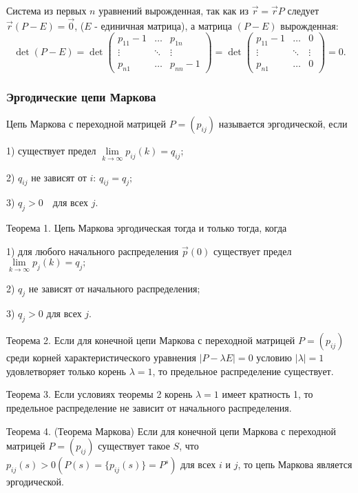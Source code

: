 Система из первых $n$ уравнений вырожденная, так как из $\vec{r} = \vec{r}P$
следует
$\vec{r}(P - E) = \vec{0}$, ($E$ - единичная матрица),
а матрица $(P - E)$ вырожденная:
\[
	\det(P - E) =
	\det \begin{pmatrix}
		p_{11} - 1 & \dots  & p_{1n}     \\
		\vdots     & \ddots & \vdots     \\
		p_{n1}     & \dots  & p_{nn} - 1
	\end{pmatrix}
	=
	\det \begin{pmatrix}
		p_{11} - 1 & \dots  & 0      \\
		\vdots     & \ddots & \vdots \\
		p_{n1}     & \dots  & 0
	\end{pmatrix}
	= 0.
\]

\subsubsection*{Эргодические цепи Маркова}

Цепь Маркова с переходной матрицей $P = (p_{ij})$ называется эргодической, если

1) существует предел
$\lim\limits_{k \to \infty} p_{ij}(k) = q_{ij};$

2) $q_{ij}$ не зависят от $i$:
$q_{ij} = q_j;$

3)
$q_j > 0 \quad \text{для всех } j.$

Теорема 1. Цепь Маркова эргодическая тогда и только тогда, когда

1) для любого начального распределения $\vec{p}(0)$ существует предел
$\lim\limits_{k \to \infty} p_{j}(k) = q_j;$

2) $q_j$ не зависят от начального распределения;

3) $q_j > 0$ для всех $j$.

Теорема 2. Если для конечной цепи Маркова с переходной матрицей $P=(p_{ij})$ среди корней характеристического уравнения $|P-\lambda E|=0$ условию $|\lambda|=1$ удовлетворяет только корень $\lambda=1$, то предельное распределение существует.

Теорема 3. Если условиях теоремы 2 корень $\lambda=1$ имеет кратность 1, то предельное распределение не зависит от начального распределения.

Теорема 4. (Теорема Маркова) Если для конечной цепи Маркова с переходной матрицей $P=(p_{ij})$ существует такое $S$, что $p_{ij}(s)>0 (P(s)=\{p_{ij}(s)\}=P^s)$ для всех $i$ и $j$, то цепь Маркова является эргодической.

